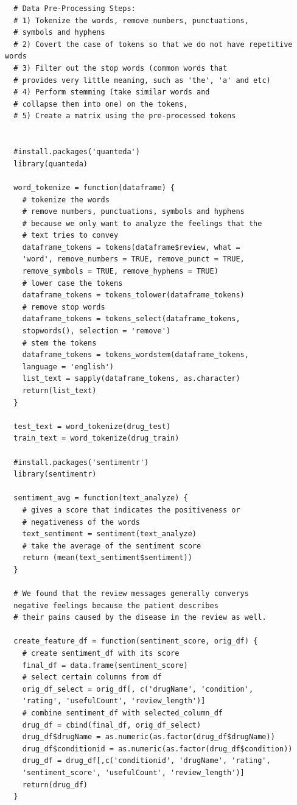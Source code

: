 \documentclass{article}
\begin{document}
\begin{verbatim}
  # Data Pre-Processing Steps:
  # 1) Tokenize the words, remove numbers, punctuations, 
  # symbols and hyphens
  # 2) Covert the case of tokens so that we do not have repetitive words 
  # 3) Filter out the stop words (common words that 
  # provides very little meaning, such as 'the', 'a' and etc)
  # 4) Perform stemming (take similar words and 
  # collapse them into one) on the tokens, 
  # 5) Create a matrix using the pre-processed tokens


  #install.packages('quanteda')
  library(quanteda)

  word_tokenize = function(dataframe) {
    # tokenize the words
    # remove numbers, punctuations, symbols and hyphens 
    # because we only want to analyze the feelings that the 
    # text tries to convey
    dataframe_tokens = tokens(dataframe$review, what = 
    'word', remove_numbers = TRUE, remove_punct = TRUE, 
    remove_symbols = TRUE, remove_hyphens = TRUE)
    # lower case the tokens
    dataframe_tokens = tokens_tolower(dataframe_tokens)
    # remove stop words
    dataframe_tokens = tokens_select(dataframe_tokens, 
    stopwords(), selection = 'remove')
    # stem the tokens
    dataframe_tokens = tokens_wordstem(dataframe_tokens, 
    language = 'english')
    list_text = sapply(dataframe_tokens, as.character)
    return(list_text)
  }

  test_text = word_tokenize(drug_test)
  train_text = word_tokenize(drug_train)

  #install.packages('sentimentr')
  library(sentimentr)

  sentiment_avg = function(text_analyze) {
    # gives a score that indicates the positiveness or 
    # negativeness of the words
    text_sentiment = sentiment(text_analyze)
    # take the average of the sentiment score
    return (mean(text_sentiment$sentiment))
  }

  # We found that the review messages generally converys 
  negative feelings because the patient describes
  # their pains caused by the disease in the review as well. 

  create_feature_df = function(sentiment_score, orig_df) {
    # create sentiment_df with its score
    final_df = data.frame(sentiment_score)
    # select certain columns from df
    orig_df_select = orig_df[, c('drugName', 'condition', 
    'rating', 'usefulCount', 'review_length')]
    # combine sentiment_df with selected_column_df
    drug_df = cbind(final_df, orig_df_select)
    drug_df$drugName = as.numeric(as.factor(drug_df$drugName))
    drug_df$conditionid = as.numeric(as.factor(drug_df$condition))
    drug_df = drug_df[,c('conditionid', 'drugName', 'rating', 
    'sentiment_score', 'usefulCount', 'review_length')]
    return(drug_df)
  }


\end{verbatim}
\end{document}
